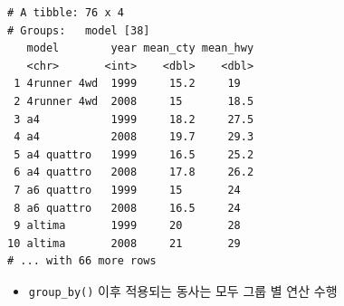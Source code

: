 \documentclass[
  11pt,
]{krantz}
\newenvironment{Shaded}{\begin{snugshade}}{\end{snugshade}}
\newcommand{\CommentTok}[1]{\textcolor[rgb]{0.37,0.37,0.37}{\textit{#1}}}
\newcommand{\DataTypeTok}[1]{\textcolor[rgb]{0.27,0.27,0.27}{#1}}
\newcommand{\KeywordTok}[1]{\textcolor[rgb]{0.27,0.27,0.27}{\textbf{#1}}}
\newcommand{\NormalTok}[1]{#1}
\newcommand{\OperatorTok}[1]{\textcolor[rgb]{0.43,0.43,0.43}{\textbf{#1}}}
\newcommand{\StringTok}[1]{\textcolor[rgb]{0.5,0.5,0.5}{#1}}
\providecommand{\tightlist}{%
  \setlength{\itemsep}{0pt}\setlength{\parskip}{0pt}}
\begin{document}
\begin{Shaded}
\end{Shaded}

\begin{verbatim}
# A tibble: 76 x 4
# Groups:   model [38]
   model        year mean_cty mean_hwy
   <chr>       <int>    <dbl>    <dbl>
 1 4runner 4wd  1999     15.2     19  
 2 4runner 4wd  2008     15       18.5
 3 a4           1999     18.2     27.5
 4 a4           2008     19.7     29.3
 5 a4 quattro   1999     16.5     25.2
 6 a4 quattro   2008     17.8     26.2
 7 a6 quattro   1999     15       24  
 8 a6 quattro   2008     16.5     24  
 9 altima       1999     20       28  
10 altima       2008     21       29  
# ... with 66 more rows
\end{verbatim}

\normalsize

\footnotesize

\begin{Shaded}
\end{Shaded}

\normalsize

\begin{itemize}
\tightlist
\item
  \texttt{group\_by()} 이후 적용되는 동사는 모두 그룹 별 연산 수행
\end{itemize}

\footnotesize

\begin{Shaded}
\end{Shaded}
\end{document}
